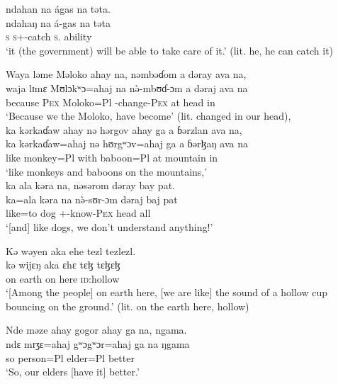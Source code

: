  \medskip
 ndahan  na  ágas  na  təta.\\
 \gll ndahaŋ   na  á-gas        na   təta\\
 \textsc{s}    {\PSP}  \textsc{s}+{\IFV}-catch  \textsc{s}.{\DO}  ability\\
 \glt ‘it (the government) will be able to take care of it.’  (lit. he, he can catch it)
 \z

\ea Waya  ləme  Məloko  ahay  na,  nəmbəɗom  a  dəray  ava  na,     \\
 \gll waja  lɪmɛ  Mʊlɔkʷɔ=ahaj    na  n\`ə-mbʊɗ-ɔm      a  dəraj  ava  na\\
 because    \textsc{Pex}     Moloko=Pl  {\PSP} {\PFV}-change-\textsc{Pex}  at   head  in    {\PSP}\\
 \glt ‘Because we the Moloko, have become' (lit. changed in our head),  \\
 
 \medskip
 ka  kərkaɗaw  ahay  nə  hərgov  ahay  ga  a  ɓərzlan  ava  na,\\
 \gll ka    kərkaɗaw=ahaj  nə   hʊrgʷɔv=ahaj ga a ɓərɮaŋ     ava    na\\
 like  monkey=Pl        with  baboon=Pl  {\ADJ}  at  mountain    in    {\PSP}\\
 \glt ‘like monkeys and baboons on the mountains,’\\
 
 \medskip
  ka ala  kəra  na,  nəsərom  dəray  bay  pat.    \\ 
 \gll ka=ala   kəra      na  n\`ə-sʊr-ɔm     dəraj   baj   pat \\
 like=to  dog   {\PSP} +{\PFV}-know-\textsc{Pex}  head  {\NEG}  all\\
 \glt ‘[and] like dogs, we don’t understand anything!’ 
 \z

\ea Kə  wəyen  aka  ehe  tezl tezlezl.\\
 \gll kə   wijɛŋ   aka   ɛhɛ  {tɛɮ tɛɮɛɮ}\\
 on  earth  on  here  \textsc{id}:hollow\\
 \glt ‘[Among the people] on earth here, [we are like] the sound of a hollow cup bouncing on the ground.’ (lit. on the earth here, hollow)
 \z

\ea Nde  məze  ahay  gogor  ahay  ga  na,  ngama.\\
 \gll ndɛ  mɪʒɛ=ahaj  gʷɔgʷɔr=ahaj ga  na   ŋgama\\
 so    person=Pl  elder=Pl   {\ADJ}   {\PSP}  better\\
\glt  ‘So, our elders [have it] better.’ 
 \z


